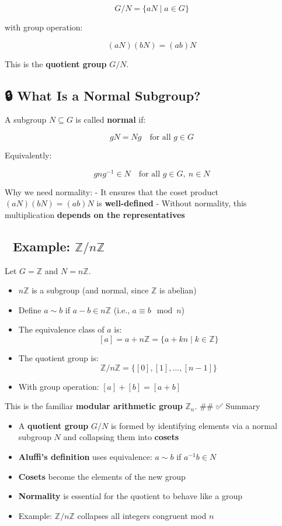\documentclass[
]{article}
\providecommand{\tightlist}{%
  \setlength{\itemsep}{0pt}\setlength{\parskip}{0pt}}
\begin{document}
\[
G / N = \{ aN \mid a \in G \}
\]

with group operation:

\[
(aN)(bN) = (ab)N
\]

This is the \textbf{quotient group} \(G/N\).

\subsection{🔒 What Is a Normal
Subgroup?}\label{what-is-a-normal-subgroup}

A subgroup \(N \subseteq G\) is called \textbf{normal} if:

\[
gN = Ng \quad \text{for all } g \in G
\]

Equivalently:

\[
gng^{-1} \in N \quad \text{for all } g \in G,\ n \in N
\]

Why we need normality: - It ensures that the coset product
\((aN)(bN) = (ab)N\) is \textbf{well-defined} - Without normality, this
multiplication \textbf{depends on the representatives}

\subsection{\texorpdfstring{🧮 Example:
\(\mathbb{Z} / n\mathbb{Z}\)}{🧮 Example: \textbackslash mathbb\{Z\} / n\textbackslash mathbb\{Z\}}}\label{example-mathbbz-nmathbbz}

Let \(G = \mathbb{Z}\) and \(N = n\mathbb{Z}\).

\begin{itemize}
\tightlist
\item
  \(n\mathbb{Z}\) is a subgroup (and normal, since \(\mathbb{Z}\) is
  abelian)
\item
  Define \(a \sim b\) if \(a - b \in n\mathbb{Z}\) (i.e.,
  \(a \equiv b \mod n\))
\item
  The equivalence class of \(a\) is: \[
  [a] = a + n\mathbb{Z} = \{ a + kn \mid k \in \mathbb{Z} \}
  \]
\item
  The quotient group is: \[
  \mathbb{Z} / n\mathbb{Z} = \{ [0], [1], \dots, [n - 1] \}
  \]
\item
  With group operation: \([a] + [b] = [a + b]\)
\end{itemize}

This is the familiar \textbf{modular arithmetic group} \(\mathbb{Z}_n\).
\#\# ✅ Summary

\begin{itemize}
\tightlist
\item
  A \textbf{quotient group} \(G/N\) is formed by identifying elements
  via a normal subgroup \(N\) and collapsing them into \textbf{cosets}
\item
  \textbf{Aluffi's definition} uses equivalence: \(a \sim b\) if
  \(a^{-1}b \in N\)
\item
  \textbf{Cosets} become the elements of the new group
\item
  \textbf{Normality} is essential for the quotient to behave like a
  group
\item
  Example: \(\mathbb{Z}/n\mathbb{Z}\) collapses all integers congruent
  mod \(n\)
\end{itemize}
\end{document}
